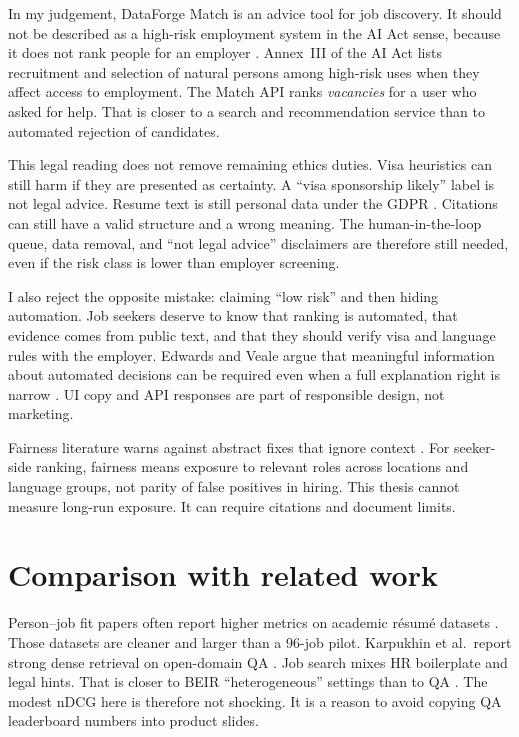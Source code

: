 In my judgement, DataForge Match is an advice tool for job discovery. It should not be described as a high-risk employment system in the AI Act sense, because it does not rank people for an employer . Annex~III of the AI Act lists recruitment and selection of natural persons among high-risk uses when they affect access to employment. The Match API ranks \emph{vacancies} for a user who asked for help. That is closer to a search and recommendation service than to automated rejection of candidates.

This legal reading does not remove remaining ethics duties. Visa heuristics can still harm if they are presented as certainty. A ``visa sponsorship likely'' label is not legal advice. Resume text is still personal data under the GDPR . Citations can still have a valid structure and a wrong meaning. The human-in-the-loop queue, data removal, and ``not legal advice'' disclaimers are therefore still needed, even if the risk class is lower than employer screening.

I also reject the opposite mistake: claiming ``low risk'' and then hiding automation. Job seekers deserve to know that ranking is automated, that evidence comes from public text, and that they should verify visa and language rules with the employer. Edwards and Veale argue that meaningful information about automated decisions can be required even when a full explanation right is narrow . UI copy and API responses are part of responsible design, not marketing.

Fairness literature warns against abstract fixes that ignore context . For seeker-side ranking, fairness means exposure to relevant roles across locations and language groups, not parity of false positives in hiring. This thesis cannot measure long-run exposure. It can require citations and document limits.

\section{Comparison with related work}
\label{sec:compare-lit}

Person--job fit papers often report higher metrics on academic résumé datasets . Those datasets are cleaner and larger than a 96-job pilot. Karpukhin et al.\ report strong dense retrieval on open-domain QA . Job search mixes HR boilerplate and legal hints. That is closer to BEIR ``heterogeneous'' settings than to QA . The modest nDCG here is therefore not shocking. It is a reason to avoid copying QA leaderboard numbers into product slides.

